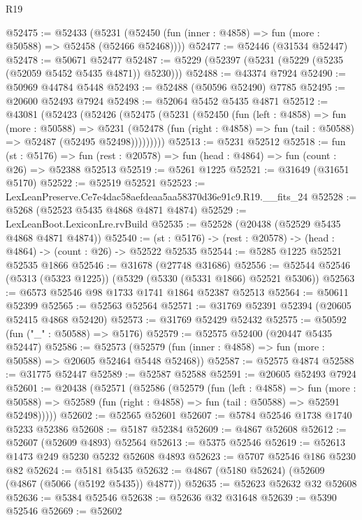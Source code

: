 \begin{lexlean}{R19}
\begin{coremodule}
@52475 := @52433
    (@5231 (@52450 (fun (inner : @4858) => fun (more : @50588) => @52458 (@52466 @52468))))
@52477 := @52446 (@31534 @52447)
@52478 := @50671 @52477
@52487 := @5229 (@52397 (@5231 (@5229 (@5235 (@52059 @5452 @5435 @4871)) @5230)))
@52488 := @43374 @7924
@52490 := @50969 @44784 @5448
@52493 := @52488 (@50596 @52490) @7785
@52495 := @20600 @52493 @7924
@52498 := @52064 @5452 @5435 @4871
@52512 := @43081
    (@52423
      (@52426
        (@52475
          (@5231
            (@52450
              (fun (left : @4858) =>
              fun (more : @50588) =>
              @5231
                (@52478
                  (fun (right : @4858) => fun (tail : @50588) => @52487 (@52495 @52498)))))))))
@52513 := @5231 @52512
@52518 := fun (st : @5176) =>
  fun (rest : @20578) => fun (head : @4864) => fun (count : @26) => @52388 @52513
@52519 := @5261 @1225
@52521 := @31649 (@31651 @5170)
@52522 := @52519 @52521
@52523 := LexLeanPreserve.Ce7e4dac58aefdeaa5aa58370d36e91c9.R19.__fits_24
@52528 := @5268 (@52523 @5435 @4868 @4871 @4874)
@52529 := LexLeanBoot.LexiconLre.rvBuild
@52535 := @52528 (@20438 (@52529 @5435 @4868 @4871 @4874))
@52540 := (st : @5176) -> (rest : @20578) -> (head : @4864) -> (count : @26) -> @52522 @52535
@52544 := @5285 @1225 @52521 @52535 @1866
@52546 := @31678 (@27748 @31686)
@52556 := @52544 @52546 (@5313 (@5323 @1225)) (@5329 (@5330 (@5331 @1866) @52521 @5306))
@52563 := @6573 @52546 @98 @1733 @1741 @1864 @52387 @52513
@52564 := @50611 @52399
@52565 := @52563 @52564
@52571 := @31769 @52391 @52394 (@20605 @52415 @4868 @52420)
@52573 := @31769 @52429 @52432
@52575 := @50592 (fun ("_" : @50588) => @5176)
@52579 := @52575 @52400 (@20447 @5435 @52447)
@52586 := @52573 (@52579 (fun (inner : @4858) => fun (more : @50588) => @20605 @52464 @5448 @52468))
@52587 := @52575 @4874
@52588 := @31775 @52447
@52589 := @52587 @52588
@52591 := @20605 @52493 @7924
@52601 := @20438
    (@52571
      (@52586
        (@52579
          (fun (left : @4858) =>
          fun (more : @50588) =>
          @52589 (fun (right : @4858) => fun (tail : @50588) => @52591 @52498)))))
@52602 := @52565 @52601
@52607 := @5784 @52546 @1738 @1740 @5233 @52386
@52608 := @5187 @52384
@52609 := @4867 @52608
@52612 := @52607 (@52609 @4893) @52564
@52613 := @5375 @52546
@52619 := @52613 @1473 @249 @5230 @5232 @52608 @4893
@52623 := @5707 @52546 @186 @5230 @82
@52624 := @5181 @5435
@52632 := @4867 (@5180 @52624) (@52609 (@4867 (@5066 (@5192 @5435)) @4877))
@52635 := @52623 @52632 @32 @52608
@52636 := @5384 @52546
@52638 := @52636 @32 @31648
@52639 := @5390 @52546
@52669 := @52602

\end{coremodule}
\end{lexlean}
